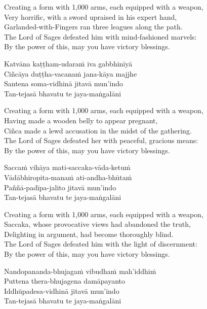 \begin{english-verses}
  Creating a form with 1,000 arms, each equipped with a weapon,\\
  Very horrific, with a sword upraised in his expert hand,\\
  Garlanded-with-Fingers ran three leagues along the path.\\
  The Lord of Sages defeated him with mind-fashioned marvels:\\
  By the power of this, may you have victory blessings.
\end{english-verses}

Katvāna kaṭṭham-udaraṁ iva gabbhinīyā\\
Ciñcāya duṭṭha-vacanaṁ jana-kāya majjhe\\
Santena soma-vidhinā jitavā mun'indo\\
Tan-tejasā bhavatu te jaya-maṅgalāni

\begin{english-verses}
  Creating a form with 1,000 arms, each equipped with a weapon,\\
  Having made a wooden belly to appear pregnant,\\
  Ciñca made a lewd accusation in the midst of the gathering.\\
  The Lord of Sages defeated her with peaceful, gracious means:\\
  By the power of this, may you have victory blessings.
\end{english-verses}

Saccaṁ vihāya mati-saccaka-vāda-ketuṁ\\
Vādābhiropita-manaṁ ati-andha-bhūtaṁ\\
Paññā-padīpa-jalito jitavā mun'indo\\
Tan-tejasā bhavatu te jaya-maṅgalāni

\begin{english-verses}
  Creating a form with 1,000 arms, each equipped with a weapon,\\
  Saccaka, whose provocative views had abandoned the truth,\\
  Delighting in argument, had become thoroughly blind.\\
  The Lord of Sages defeated him with the light of discernment:\\
  By the power of this, may you have victory blessings.
\end{english-verses}

Nandopananda-bhujagaṁ vibudhaṁ mah'iddhiṁ\\
Puttena thera-bhujagena damāpayanto\\
Iddhūpadesa-vidhinā jitavā mun'indo\\
Tan-tejasā bhavatu te jaya-maṅgalāni

